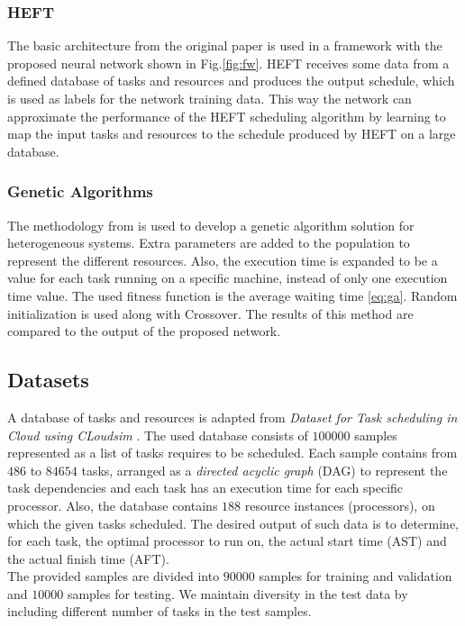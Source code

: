 \subsubsection{HEFT}
The basic architecture from the original paper \cite{993206} is used in a framework with the proposed neural network shown in Fig.\ref{fig:fw}. HEFT receives some data from a defined database of tasks and resources and produces the output schedule, which is used as labels for the network training data. This way the network can approximate the performance of the HEFT scheduling algorithm by learning to map the input tasks and resources to the schedule produced by HEFT on a large database. \\

\subsubsection{Genetic Algorithms}
The methodology from \cite{article2} is used to develop a genetic algorithm solution for heterogeneous systems. Extra parameters are added to the population to represent the different resources. Also, the execution time is expanded to be a value for each task running on a specific machine, instead of only one execution time value. The used fitness function is the average waiting time \ref{eq:ga}. Random initialization is used along with Crossover. The results of this method are compared to the output of the proposed network.

\subsection{Datasets}
A database of tasks and resources is adapted from \emph{Dataset for Task scheduling in Cloud using CLoudsim} \cite{px5b-b729-20}. The used database consists of $100000$ samples represented as a list of tasks requires to be scheduled. Each sample contains from $486$ to $84654$ tasks, arranged as a \emph{directed acyclic graph} (DAG) to represent the task dependencies and each task has an execution time for each specific processor. Also, the database contains $188$ resource instances (processors), on which the given tasks scheduled. The desired output of such data is to determine, for each task, the optimal processor to run on, the actual start time (AST) and the actual finish time (AFT). \\

The provided samples are divided into $90000$ samples for training and validation and $10000$  samples for testing. We maintain diversity in the test data by including different number of tasks in the test samples.

